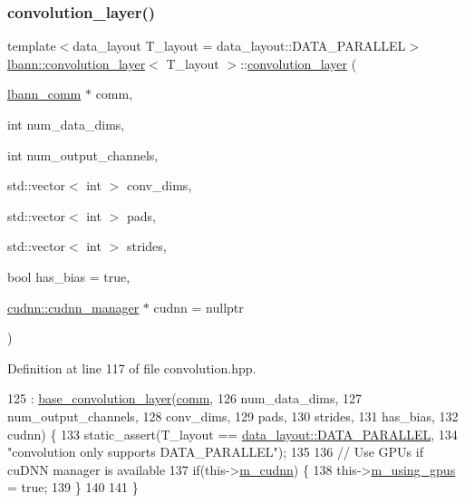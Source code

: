 \subsubsection{\texorpdfstring{convolution\+\_\+layer()}{convolution\_layer()}\hspace{0.1cm}{\footnotesize\ttfamily [2/2]}}
{\footnotesize\ttfamily template$<$data\+\_\+layout T\+\_\+layout = data\+\_\+layout\+::\+D\+A\+T\+A\+\_\+\+P\+A\+R\+A\+L\+L\+EL$>$ \\
\hyperlink{classlbann_1_1convolution__layer}{lbann\+::convolution\+\_\+layer}$<$ T\+\_\+layout $>$\+::\hyperlink{classlbann_1_1convolution__layer}{convolution\+\_\+layer} (\begin{DoxyParamCaption}\item[{\hyperlink{classlbann_1_1lbann__comm}{lbann\+\_\+comm} $\ast$}]{comm,  }\item[{int}]{num\+\_\+data\+\_\+dims,  }\item[{int}]{num\+\_\+output\+\_\+channels,  }\item[{std\+::vector$<$ int $>$}]{conv\+\_\+dims,  }\item[{std\+::vector$<$ int $>$}]{pads,  }\item[{std\+::vector$<$ int $>$}]{strides,  }\item[{bool}]{has\+\_\+bias = {\ttfamily true},  }\item[{\hyperlink{classlbann_1_1cudnn_1_1cudnn__manager}{cudnn\+::cudnn\+\_\+manager} $\ast$}]{cudnn = {\ttfamily nullptr} }\end{DoxyParamCaption})\hspace{0.3cm}{\ttfamily [inline]}}



Definition at line 117 of file convolution.\+hpp.


\begin{DoxyCode}
125     : \hyperlink{classlbann_1_1base__convolution__layer_a1489c6034dc88a8749ccd0ae4a3b02a8}{base\_convolution\_layer}(\hyperlink{file__io_8cpp_ab048c6f9fcbcfaa57ce68b00263dbebe}{comm},
126                              num\_data\_dims,
127                              num\_output\_channels,
128                              conv\_dims,
129                              pads,
130                              strides,
131                              has\_bias,
132                              cudnn) \{
133     static\_assert(T\_layout == \hyperlink{base_8hpp_a786677cbfb3f5677b4d84f3056eb08dba37d2a3465f7cbf4ab60f4e79944d0638}{data\_layout::DATA\_PARALLEL},
134                   \textcolor{stringliteral}{"convolution only supports DATA\_PARALLEL"});
135 
136     \textcolor{comment}{// Use GPUs if cuDNN manager is available}
137     \textcolor{keywordflow}{if}(this->\hyperlink{classlbann_1_1Layer_a08dbb94239e3b8c96329786c57c72e21}{m\_cudnn}) \{
138       this->\hyperlink{classlbann_1_1Layer_af7881cb5eff5207c15fa835d65462e8f}{m\_using\_gpus} = \textcolor{keyword}{true};
139     \}
140 
141   \}
\end{DoxyCode}


